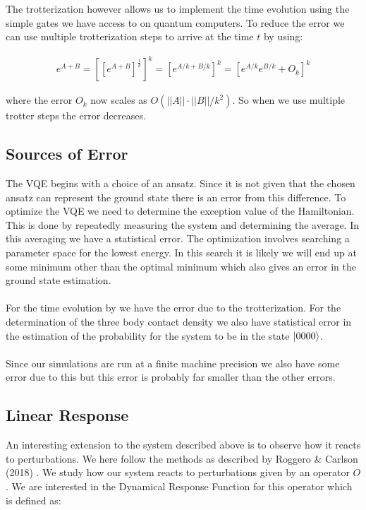 \documentclass[10 pt, a4paper]{article}
\begin{document}
The trotterization however allows us to implement the time evolution using the simple gates we have access to on quantum computers. To reduce the error we can use multiple trotterization steps to arrive at the time $t$ by using:

\begin{align*}
e^{A+B} = \left[ \left[ e^{A+B} \right]^\frac{1}{k} \right]^k =\left[  e^{A/k+B/k} \right]^k = \left[  e^{A/k} e^{B/k} + O_k \right]^k
\end{align*}

where the error $O_k$ now scales as $O(||A|| \cdot ||B||/k^2)$. So when we use multiple trotter steps the error decreases.

\subsection{Sources of Error}

The VQE begins with a choice of an ansatz. Since it is not given that the chosen ansatz can represent the ground state there is an error from this difference. To optimize the VQE we need to determine the exception value of the Hamiltonian. This is done by repeatedly measuring the system and determining the average. In this averaging we have a statistical error. The optimization involves searching a parameter space for the lowest energy. In this search it is likely we will end up at some minimum other than the optimal minimum which also gives an error in the ground state estimation.
\\
\\
For the time evolution by we have the error due to the trotterization. For the determination of the three body contact density we also have statistical error in the estimation of the probability for the system to be in the state $\ket{0000}$.
\\
\\
Since our simulations are run at a finite machine precision we also have some error due to this but this error is probably far smaller than the other errors.

\subsection{Linear Response} \label{sec:linres}

An interesting extension to the system described above is to observe how it reacts to perturbations. We here follow the methods as described by Roggero \& Carlson (2018) \cite{linres}. We study how our system reacts to perturbations given by an operator $O$. We are interested in the Dynamical Response Function for this operator which is defined as:
\end{document}
